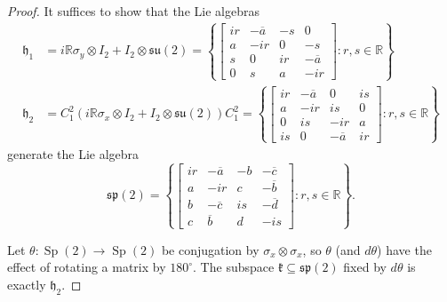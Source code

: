 \documentclass[reqno]{amsart}
\theoremstyle{definition} \newtheorem{example}[theorem]{Example}
\newcommand{\RR}{\mathbb{R}}
\newcommand{\Sp}{\operatorname{Sp}}
\newcommand{\su}{\mathfrak{su}}
\renewcommand{\sp}{\mathfrak{sp}}
\newcommand{\h}{\mathfrak{h}}
\renewcommand{\k}{\mathfrak{k}}
\begin{document}
\begin{proof}
It suffices to show that the Lie algebras
\begin{align*}
\h_1 &= i \RR\sigma_y \otimes I_2 + I_2 \otimes \su(2) = \left\{ \left[ \begin{smallmatrix}
ir & -\overline{a} & -s & 0\\
a &  -ir & 0 & -s\\
s & 0 & ir & -\overline{a}\\
0 & s & a & -ir \end{smallmatrix} \right] : r,s \in \RR\right\} \\
\h_2 &= C_1^2 (i \RR \sigma_x \otimes I_2 + I_2 \otimes \su(2)) C_1^2 = \left\{ \left[ \begin{smallmatrix}
ir & -\overline{a} & 0 & is\\
a &  -ir & is & 0\\
0 & is & -ir & a\\
is & 0 & -\overline{a} & ir
\end{smallmatrix} \right] : r,s \in \RR\right\}
\end{align*}
generate the Lie algebra
\begin{equation*}
\sp(2) = \left\{ \left[ \begin{smallmatrix}
ir & -\overline{a} & -b & -\overline{c}\\
a &  -ir 		  & c   & -\overline{b}\\
b & -\overline{c}  & is & -\overline{d}\\
c & \overline{b}   & d  & -is
\end{smallmatrix}\right] : r,s \in \RR \right\}.
\end{equation*}

Let $\theta : \Sp(2) \to \Sp(2)$ be conjugation by $\sigma_x \otimes \sigma_x$, so $\theta$ (and $d\theta$) have the effect of rotating a matrix by $180^\circ$. The subspace $\k \subseteq \sp(2)$ fixed by $d\theta$ is exactly $\h_2$. 


\end{proof}
\end{document}
